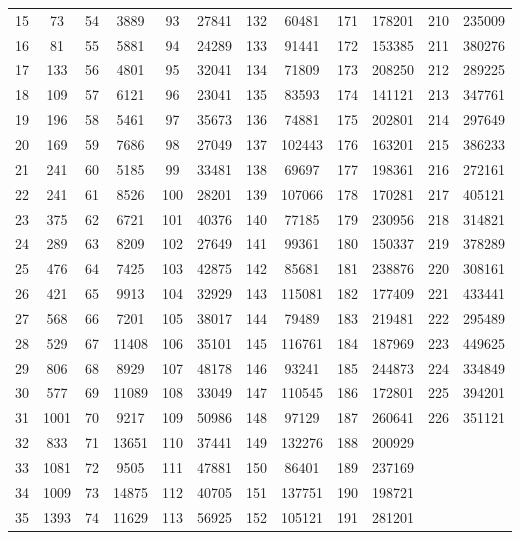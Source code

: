 \documentclass{amsart}
\theoremstyle{plain}
\theoremstyle{definition}
\theoremstyle{remark}
\begin{document}
\begin{table}[htbp]
\begin{tabular}{ @{} cc !{\vrule width 1pt} cc !{\vrule width 1pt} cc !{\vrule width 1pt} cc !{\vrule width 1pt} cc !{\vrule width 1pt} cc @{} }
    15 & 73 & 54 & 3889 & 93 & 27841 & 132 & 60481 & 171 & 178201 & 210 & 235009 \\
    16 & 81 & 55 & 5881 & 94 & 24289 & 133 & 91441 & 172 & 153385 & 211 & 380276 \\
    17 & 133 & 56 & 4801 & 95 & 32041 & 134 & 71809 & 173 & 208250 & 212 & 289225 \\
    18 & 109 & 57 & 6121 & 96 & 23041 & 135 & 83593 & 174 & 141121 & 213 & 347761 \\
    19 & 196 & 58 & 5461 & 97 & 35673 & 136 & 74881 & 175 & 202801 & 214 & 297649 \\
    20 & 169 & 59 & 7686 & 98 & 27049 & 137 & 102443 & 176 & 163201 & 215 & 386233 \\
    21 & 241 & 60 & 5185 & 99 & 33481 & 138 & 69697 & 177 & 198361 & 216 & 272161 \\
    22 & 241 & 61 & 8526 & 100 & 28201 & 139 & 107066 & 178 & 170281 & 217 & 405121 \\
    23 & 375 & 62 & 6721 & 101 & 40376 & 140 & 77185 & 179 & 230956 & 218 & 314821 \\
    24 & 289 & 63 & 8209 & 102 & 27649 & 141 & 99361 & 180 & 150337 & 219 & 378289 \\
    25 & 476 & 64 & 7425 & 103 & 42875 & 142 & 85681 & 181 & 238876 & 220 & 308161 \\
    26 & 421 & 65 & 9913 & 104 & 32929 & 143 & 115081 & 182 & 177409 & 221 & 433441 \\
    27 & 568 & 66 & 7201 & 105 & 38017 & 144 & 79489 & 183 & 219481 & 222 & 295489 \\
    28 & 529 & 67 & 11408 & 106 & 35101 & 145 & 116761 & 184 & 187969 & 223 & 449625 \\
    29 & 806 & 68 & 8929 & 107 & 48178 & 146 & 93241 & 185 & 244873 & 224 & 334849 \\
    30 & 577 & 69 & 11089 & 108 & 33049 & 147 & 110545 & 186 & 172801 & 225 & 394201 \\
    31 & 1001 & 70 & 9217 & 109 & 50986 & 148 & 97129 & 187 & 260641 & 226 & 351121 \\
    32 & 833 & 71 & 13651 & 110 & 37441 & 149 & 132276 & 188 & 200929 &  &  \\
    33 & 1081 & 72 & 9505 & 111 & 47881 & 150 & 86401 & 189 & 237169 &  &  \\
    34 & 1009 & 73 & 14875 & 112 & 40705 & 151 & 137751 & 190 & 198721 &  &  \\
    35 & 1393 & 74 & 11629 & 113 & 56925 & 152 & 105121 & 191 & 281201 &  &  \\

\end{tabular}
\end{table}
\end{document}
